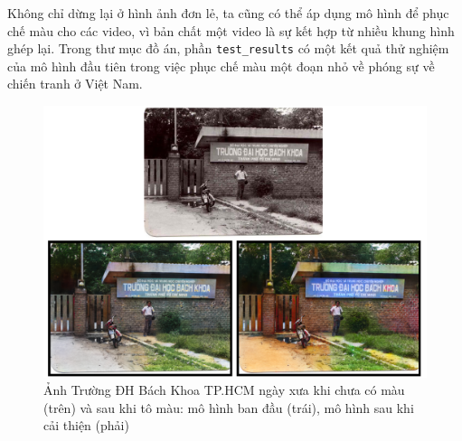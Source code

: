 \documentclass[a4paper, 12pt]{report}
\begin{document}
Không chỉ dừng lại ở hình ảnh đơn lẻ, ta cũng có thể áp dụng mô hình để phục chế màu cho các video, vì bản chất một video là sự kết hợp từ nhiều khung hình ghép lại.
Trong thư mục đồ án, phần \texttt{test\_results} có một kết quả thử nghiệm của mô hình đầu tiên trong việc phục chế màu một đoạn nhỏ về phóng sự về chiến tranh ở Việt Nam.

\begin{figure}[!h]
\captionsetup{width=0.85\textwidth}
\centering
\includegraphics[width=15cm]{images/final.PNG}
\caption{Ảnh Trường ĐH Bách Khoa TP.HCM ngày xưa khi chưa có màu (trên) và sau khi tô màu: mô hình ban đầu (trái), mô hình sau khi cải thiện (phải)}
\label{fig:bkhcmold}
\end{figure}

\renewcommand{\bibname}{Tài liệu tham khảo}
\printbibliography
\end{document}

